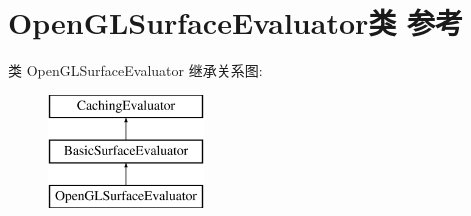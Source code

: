 \hypertarget{class_open_g_l_surface_evaluator}{}\section{Open\+G\+L\+Surface\+Evaluator类 参考}
\label{class_open_g_l_surface_evaluator}
类 Open\+G\+L\+Surface\+Evaluator 继承关系图\+:\begin{figure}[H]
\begin{center}
\leavevmode
\includegraphics[height=3.000000cm]{class_open_g_l_surface_evaluator}
\end{center}
\end{figure}
